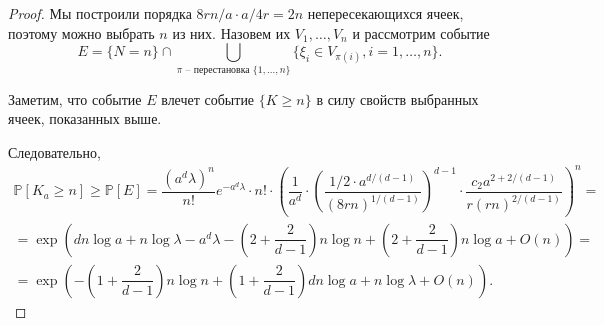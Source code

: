 \documentclass[12pt]{article}
\theoremstyle{plain}
\newtheorem{thm}{Теорема} %
\theoremstyle{definition}
\theoremstyle{remark}
\def\geq{\geqslant}
\def\leq{\leqslant}
\newcommand{\slim}{\sum\limits}
\newcommand{\PP}{\mathbb{P}}
\begin{document}
\begin{proof}
    
    Мы построили порядка $8rn/a \cdot a/4r = 2n$ непересекающихся ячеек, поэтому можно выбрать $n$ из них. Назовем их $V_1, \ldots, V_n$  и рассмотрим событие $$E = \{N=n\}\cap \bigcup\limits_{\pi \text{ -- перестановка } \{1, \ldots, n\}} \{\xi_i \in V_{\pi(i)}, i = 1, \ldots, n\}.$$
                         
    Заметим, что событие $E$ влечет событие $\{K \geq n\}$ в силу свойств выбранных ячеек, показанных выше.
  
    Следовательно, 
    \begin{multline*}
        \PP[K_a\geq n] \geq \PP[E] = \dfrac{(a^d\lambda)^n}{n!}e^{-a^d\lambda}\cdot n!
        \cdot \left(\dfrac{1}{a^d}\cdot\left(\dfrac{1/2\cdot a^{d/(d-1)}}{(8rn)^{1/(d-1)}}\right)^{d-1}\cdot
        \dfrac{c_2a^{2+ 2/(d-1)}}{r(rn)^{2/(d-1)}}\right)^n = \\
        =\exp\left(dn\log a + n\log\lambda - a^d\lambda - \left(2+\dfrac{2}{d-1}\right)n\log n + \left(2+\dfrac{2}{d-1}\right) n\log a  + O(n)\right) = \\
        =\exp\left(-\left(1+ \dfrac{2}{d-1}\right)n\log n + \left(1 + \dfrac{2}{d-1}\right)dn\log a + n\log\lambda + O(n)\right).
    \end{multline*}{}
\end{proof}{}

%
\end{document}
